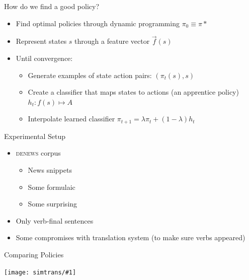 \documentclass[compress]{beamer}
\newcommand{\gfxs}[2]{
\begin{center}
	\texttt{[image: simtrans/\#1]}
\end{center}
}
\begin{document}
\begin{frame}{How do we find a good policy?}

  \begin{itemize}
    \item Find optimal policies through dynamic programming $\pi_0
      \equiv \pi*$
    \item Represent states $s$ through a feature vector $\vec f(s)$
      \pause
    \item Until convergence:
      \begin{itemize}
        \item Generate examples of state action pairs: $(\pi_t(s), s)$
        \item Create a classifier that maps states to actions (an
          apprentice policy) $h_t: f(s) \mapsto A$ 
    \item Interpolate learned classifier $\pi_{t+1} = \lambda \pi_t +
      (1-\lambda) h_t$
  \end{itemize}
  \end{itemize}

\end{frame}


\begin{frame}{Experimental Setup}

  \begin{itemize}
    \item \textsc{denews} corpus
      \begin{itemize}
        \item News snippets
        \item Some formulaic
        \item Some surprising
      \end{itemize}
    \item Only verb-final sentences
    \item Some compromises with translation system (to make sure verbs appeared)
  \end{itemize}

\end{frame}



\begin{frame}{Comparing Policies}

  \gfxs{cummulative}{.6}

\end{frame}
\end{document}
